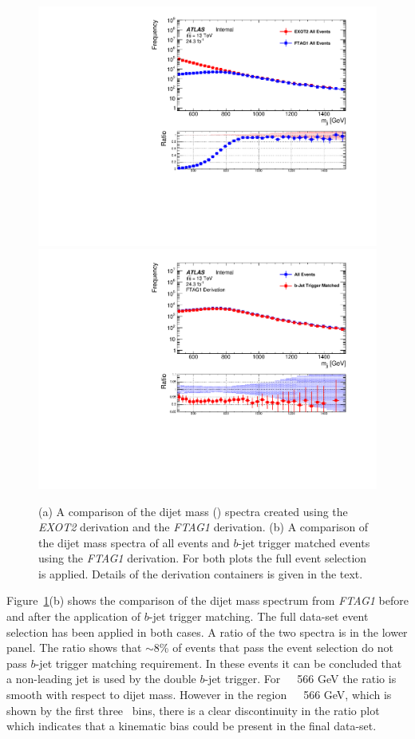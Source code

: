 \begin{figure}[!ht]
  \begin{center}
    \captionsetup[subfigure]{aboveskip=0pt,justification=centering}
    \subcaptionbox{} {\includegraphics[width=0.5\linewidth, angle=0]{figs/Dibjet/LowMass/evt-trigmatch_exot2.pdf} }\hspace{-5mm}
    \subcaptionbox{} {\includegraphics[width=0.5\linewidth, angle=0]{figs/Dibjet/LowMass/evt-trigmatch_ftag1.pdf} }
  \end{center}
  \caption{(a) A comparison of the dijet mass (\mjj) spectra created using the \textit{EXOT2} derivation and the \textit{FTAG1} derivation.
    (b) A comparison of the dijet mass spectra of all events and $b$-jet trigger matched events using the \textit{FTAG1} derivation.
    For both plots the full \lm{} event selection is applied. Details of the derivation containers is given in the text. }
     \label{fig:evt-btrig_match}
\end{figure}

Figure~\ref{fig:evt-btrig_match}(b) shows the comparison of the dijet mass spectrum from \textit{FTAG1}
before and after the application of $b$-jet trigger matching.
The full \lm{} data-set event selection has been applied in both cases.
A ratio of the two spectra is in the lower panel.
The ratio shows that $\sim$8\% of events that
pass the \lm{} event selection do not pass $b$-jet trigger matching requirement.
In these events it can be concluded that a non-leading jet is used by the double $b$-jet trigger.
For~\mjj~\gt~566 GeV the ratio is smooth with respect to dijet mass.
However in the region~\mjj~\lt~566 GeV, which is shown by the first three \mjj{}~bins,
there is a clear discontinuity in the ratio plot
which indicates that a kinematic bias could be present in the final data-set.

